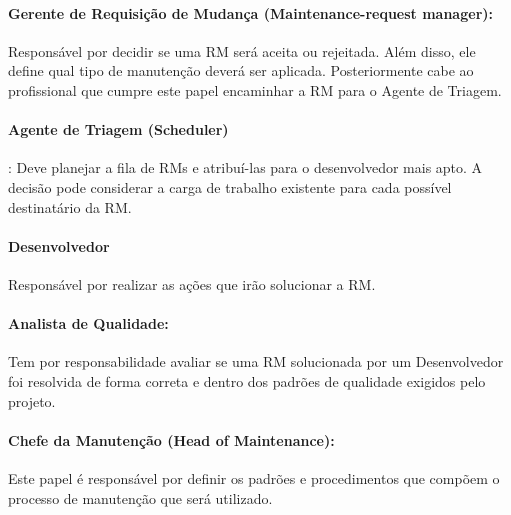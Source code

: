 

\paragraph{Gerente de Requisição de Mudança (Maintenance-request manager):}
Res\-pon\-sá\-vel por decidir se uma RM será aceita ou rejeitada. Além disso,
ele define qual tipo de manutenção deverá ser aplicada. Posteriormente cabe ao
profissional que cumpre este papel encaminhar a RM para o Agente de Triagem.

\paragraph{Agente de Triagem (Scheduler)}:
Deve planejar a fila de RMs e atribuí-las para o desenvolvedor mais apto. A
decisão pode considerar a carga de trabalho existente para cada possível
destinatário da RM\@.

\paragraph{Desenvolvedor}
Responsável por realizar as ações que irão solucionar a RM\@.

\paragraph{Analista de Qualidade:}
Tem por responsabilidade avaliar se uma RM solucionada por um Desenvolvedor foi
resolvida de forma correta e dentro dos padrões de qualidade exigidos pelo
projeto.

\paragraph{Chefe da Manutenção (Head of	Maintenance):}
Este papel é responsável por definir os padrões e procedimentos que compõem o
processo de manutenção que será utilizado.

